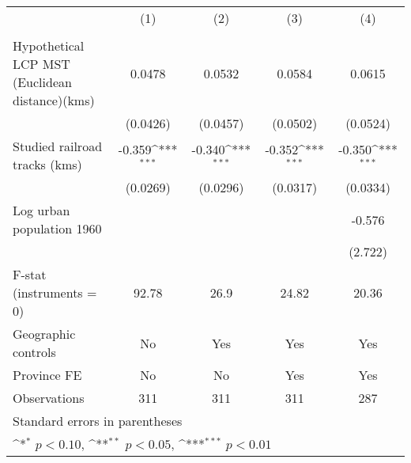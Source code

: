 {
\def\sym#1{\ifmmode^{#1}\else\(^{#1}\)\fi}
\begin{tabular}{l*{4}{c}}
\hline\hline
                &\multicolumn{1}{c}{(1)}&\multicolumn{1}{c}{(2)}&\multicolumn{1}{c}{(3)}&\multicolumn{1}{c}{(4)}\\
                &\multicolumn{1}{c}{}&\multicolumn{1}{c}{}&\multicolumn{1}{c}{}&\multicolumn{1}{c}{}\\
\hline
Hypothetical LCP MST (Euclidean distance)(kms)&   0.0478         &   0.0532         &   0.0584         &   0.0615         \\
                & (0.0426)         & (0.0457)         & (0.0502)         & (0.0524)         \\
[1em]
Studied railroad tracks (kms)&   -0.359\sym{***}&   -0.340\sym{***}&   -0.352\sym{***}&   -0.350\sym{***}\\
                & (0.0269)         & (0.0296)         & (0.0317)         & (0.0334)         \\
[1em]
Log urban population 1960&                  &                  &                  &   -0.576         \\
                &                  &                  &                  &  (2.722)         \\
\hline
F-stat (instruments = 0)&    92.78         &     26.9         &    24.82         &    20.36         \\
Geographic controls&       No         &      Yes         &      Yes         &      Yes         \\
Province FE     &       No         &       No         &      Yes         &      Yes         \\
Observations    &      311         &      311         &      311         &      287         \\
\hline\hline
\multicolumn{5}{l}{\footnotesize Standard errors in parentheses}\\
\multicolumn{5}{l}{\footnotesize \sym{*} \(p<0.10\), \sym{**} \(p<0.05\), \sym{***} \(p<0.01\)}\\
\end{tabular}
}
